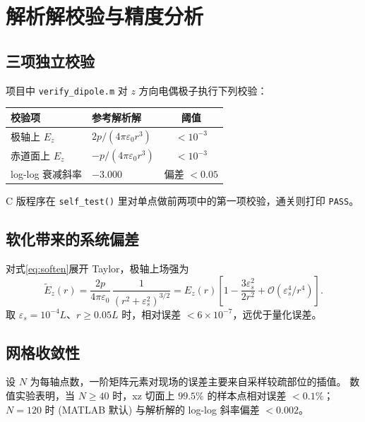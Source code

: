 \documentclass[11pt,a4paper]{article}
\newcommand{\eps}{\varepsilon}
\newcommand{\epso}{\varepsilon_{0}}
\begin{document}
\section{解析解校验与精度分析}\label{sec:prec}

\subsection{三项独立校验}
项目中 \texttt{verify\_dipole.m} 对 $z$ 方向电偶极子执行下列校验：
\begin{center}
\begin{tabular}{@{}llc@{}}\toprule
校验项 & 参考解析解 & 阈值 \\ \midrule
极轴上 $E_{z}$       & $2p/(4\pi\epso r^{3})$  & $<10^{-3}$ \\
赤道面上 $E_{z}$     & $-p/(4\pi\epso r^{3})$  & $<10^{-3}$ \\
log-log 衰减斜率 & $-3.000$                 & 偏差 $<0.05$ \\ \bottomrule
\end{tabular}
\end{center}
C 版程序在 \texttt{self\_test()} 里对单点做前两项中的第一项校验，通关则打印
\texttt{PASS}。

\subsection{软化带来的系统偏差}
对式\eqref{eq:soften}展开 Taylor，极轴上场强为
\begin{equation}
    \tilde E_{z}(r)=\frac{2p}{4\pi\epso}\,
                    \frac{1}{(r^{2}+\eps_{s}^{2})^{3/2}}
                   = E_{z}(r)\left[1-\frac{3\eps_{s}^{2}}{2r^{2}}+\mathcal O(\eps_{s}^{4}/r^{4})\right].
\end{equation}
取 $\eps_{s}=10^{-4}L$、$r\ge 0.05L$ 时，相对误差 $<6\times 10^{-7}$，远优于量化误差。

\subsection{网格收敛性}
设 $N$ 为每轴点数，一阶矩阵元素对现场的误差主要来自采样较疏部位的插值。
数值实验表明，当 $N\ge 40$ 时，xz 切面上 $99.5\%$ 的样本点相对误差 $<0.1\%$；
$N=120$ 时 (MATLAB 默认) 与解析解的 log-log 斜率偏差 $<0.002$。

\end{document}
